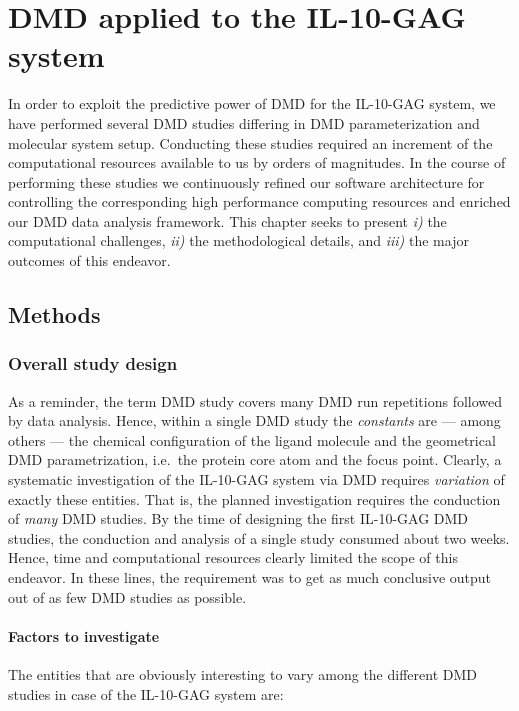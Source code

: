 \chapter{DMD applied to the IL-10-GAG system}

In order to exploit the predictive power of DMD for the IL-10-GAG system, we
have performed several DMD studies differing in DMD parameterization and
molecular system setup. Conducting these studies required an increment of the
computational resources available to us by orders of magnitudes. In the course
of performing these studies we continuously refined our software architecture
for controlling the corresponding high performance computing resources and
enriched our DMD data analysis framework. This chapter seeks to present
\textit{i)} the computational challenges, \textit{ii)} the methodological
details, and \textit{iii)} the major outcomes of this endeavor.


\section{Methods}

\subsection{Overall study design}

As a reminder, the term DMD study covers many DMD run repetitions followed by
data analysis. Hence, within a single DMD study the \textit{constants} are ---
among others --- the chemical configuration of the ligand molecule and the
geometrical DMD parametrization, i.e.\ the protein core atom and the focus
point. Clearly, a systematic investigation of the IL-10-GAG system via DMD
requires \textit{variation} of exactly these entities. That is, the planned
investigation requires the conduction of \textit{many} DMD studies. By the time
of designing the first IL-10-GAG DMD studies, the conduction and analysis of a
single study consumed about two weeks. Hence, time and computational resources
clearly limited the scope of this endeavor. In these lines, the requirement was
to get as much conclusive output out of as few DMD studies as possible.

\subsubsection{Factors to investigate}

The entities that are obviously interesting to vary among the different DMD
studies in case of the IL-10-GAG system are:

